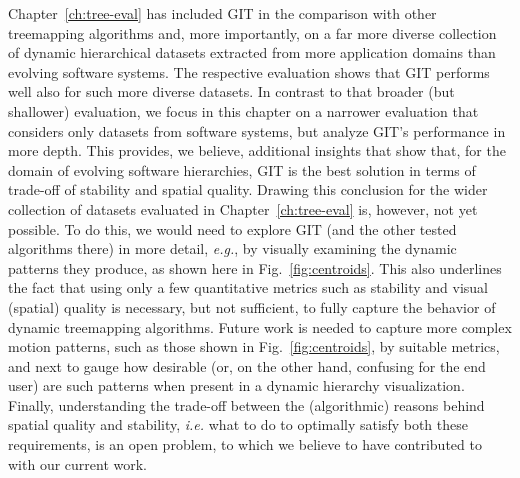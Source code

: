 Chapter~\ref{ch:tree-eval} has included GIT in the comparison with other treemapping algorithms and, more importantly, on a far more diverse collection of dynamic hierarchical datasets extracted from more application domains than evolving software systems. The respective evaluation shows that GIT performs well also for such more diverse datasets. In contrast to that broader (but shallower) evaluation, we focus in this chapter on a narrower evaluation that considers only datasets from software systems, but analyze GIT's performance in more depth. This provides, we believe, additional insights that show that, for the domain of evolving software hierarchies, GIT is the best solution in terms of trade-off of stability and spatial quality. Drawing this conclusion for the wider collection of datasets evaluated in Chapter~\ref{ch:tree-eval} is, however, not yet possible. To do this, we would need to explore GIT (and the other tested algorithms there) in more detail, \emph{e.g.}, by visually examining the dynamic patterns they produce, as shown here in Fig.~\ref{fig:centroids}. This also underlines the fact that using only a few quantitative metrics such as stability and visual (spatial) quality is necessary, but not sufficient, to fully capture the behavior of dynamic treemapping algorithms. Future work is needed to capture more complex motion patterns, such as those shown in Fig.~\ref{fig:centroids}, by suitable metrics, and next to gauge how desirable (or, on the other hand, confusing for the end user) are such patterns when present in a dynamic hierarchy visualization. Finally, understanding the trade-off between the (algorithmic) reasons behind spatial quality and stability, \emph{i.e.} what to do to optimally satisfy both these requirements, is an open problem, to which we believe to have contributed to with our current work.

